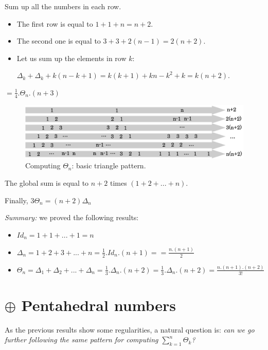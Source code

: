 Sum up all the numbers in each row.

\begin{itemize}
\item 
The first row is equal to $1+1+n = n+2$.
\item
The second one is equal to $3 + 3 + 2(n-1) = 2(n+2)$. 
\item
Let us sum up the elements in row $k$: 

$\Delta_k + \Delta_k + k(n-k+1)  = k(k+1) + kn-k^2+k = k(n+2)$.
\end{itemize}


$= \frac{1}{4}.\Theta_n.(n+3)$
\begin{figure}[h]
\begin{center}
        \includegraphics[scale=0.32]{FiguresArithmetic/appTetrahedral4}
        \caption{Computing $\Theta_n$: basic triangle pattern.}
        \label{fig:Tetrahedral4}
\end{center}
\end{figure}
The global sum is equal to $n+2$ times $(1+2+...+n)$.

Finally, $3 \Theta_n = (n+2) \Delta_n$
\medskip

\noindent \textit{Summary:} we proved the following results:
\begin{itemize}
\item $Id_n = 1+1+ ... +1 = n$
\item $\Delta_n = 1+2+3+ ... +n = \frac{1}{2}.Id_n.(n+1) = = \frac{n.(n+1)}{2}$
\item $\Theta_n = \Delta_1 + \Delta_2 + ... + \Delta_n = \frac{1}{3} .\Delta_n.(n+2) = \frac{1}{3}.\Delta_n.(n+2) = \frac{n.(n+1).(n+2)}{3!}$
\end{itemize}


\section{$\oplus$ Pentahedral numbers}

As the previous results show some regularities, a natural question is: \textit{can we go further following the same pattern for computing 
$ \sum_{k=1}^{n} \Theta_k$?}


